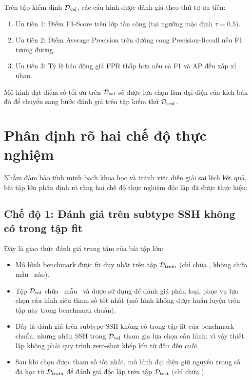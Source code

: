 Trên tập kiểm định $\mathcal{D}_{\text{val}}$, các cấu hình được đánh giá theo thứ tự ưu tiên:
\begin{enumerate}
    \item Ưu tiên 1: Điểm F1-Score trên lớp tấn công (tại ngưỡng mặc định $\tau = 0.5$).
    \item Ưu tiên 2: Điểm Average Precision trên đường cong Precision-Recall nếu F1 tương đương.
    \item Ưu tiên 3: Tỷ lệ báo động giả FPR thấp hơn nếu cả F1 và AP đều xấp xỉ nhau.
\end{enumerate}

Mô hình đạt điểm số tối ưu trên $\mathcal{D}_{\text{val}}$ sẽ được lựa chọn làm đại diện của kịch bản đó để chuyển sang bước đánh giá trên tập kiểm thử $\mathcal{D}_{\text{test}}$.

\section{Phân định rõ hai chế độ thực nghiệm}

Nhằm đảm bảo tính minh bạch khoa học và tránh việc diễn giải sai lệch kết quả, bài tập lớn phân định rõ ràng hai chế độ thực nghiệm độc lập đã được thực hiện:

\subsection{Chế độ 1: Đánh giá trên subtype SSH không có trong tập fit}
Đây là giao thức đánh giá trung tâm của bài tập lớn:
\begin{itemize}
    \item Mô hình benchmark được fit duy nhất trên tập $\mathcal{D}_{\text{train}}$ (chỉ chứa \FTP, không chứa mẫu \SSH\ nào).
    \item Tập $\mathcal{D}_{\text{val}}$ chứa \DataValidationSSH\ mẫu \SSH\ và được sử dụng để đánh giá phân loại, phục vụ lựa chọn cấu hình siêu tham số tốt nhất (mô hình không được huấn luyện trên tập này trong benchmark chuẩn).
    \item Đây là đánh giá trên subtype SSH không có trong tập fit của benchmark chuẩn, nhưng nhãn SSH trong $\mathcal{D}_{\text{val}}$ tham gia lựa chọn cấu hình; vì vậy thiết lập không phải quy trình zero-shot khép kín từ đầu đến cuối.
    \item Sau khi chọn được tham số tốt nhất, mô hình đại diện giữ nguyên trọng số đã học từ $\mathcal{D}_{\text{train}}$ để đánh giá độc lập trên tập $\mathcal{D}_{\text{test}}$ (chỉ chứa \SSH).
\end{itemize}

